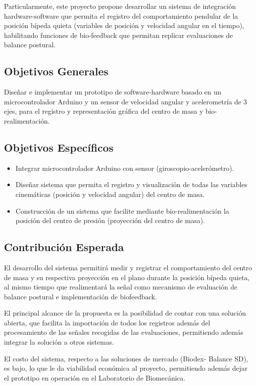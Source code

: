 \documentclass[12pt,a4paper]{article}
\begin{document}
Particularmente, este proyecto propone desarrollar un sistema de integración hardware-software que permita el registro del comportamiento pendular de la posición bípeda quieta (variables de posición y velocidad angular en el tiempo), habilitando funciones de bio-feedback que permitan replicar evaluaciones de balance postural.

\subsection{Objetivos Generales}
Diseñar e implementar un prototipo de software-hardware basado en un microcontrolador Arduino y un sensor de velocidad angular y acelerometría de 3 ejes, para el registro y representación gráfica del centro de masa y bio-realimentación.

\subsection{Objetivos Específicos}
\begin{itemize}
	\item Integrar microcontrolador Arduino con sensor (giroscopio-acelerómetro).
	\item Diseñar sistema que permita el registro y visualización de todas las variables cinemáticas (posición y velocidad angular) del centro de masa. 
	\item Construcción de un sistema que facilite mediante bio-realimentación la posición del centro de presión (proyección del centro de masa).
\end{itemize}	

\subsection{Contribución Esperada}

El desarrollo del sistema permitirá medir y registrar el comportamiento del centro de masa y su respectiva proyección en el plano durante la posición bípeda quieta, al mismo tiempo que realimentará la señal como mecanismo de evaluación de balance postural e implementación de biofeedback.

El principal alcance de la propuesta es la posibilidad de contar con una solución abierta, que facilita la importación de todos los registros además del procesamiento de las señales recogidas de las evaluaciones, permitiendo además integrar la solución a otros sistemas.

El costo del sistema, respecto a las soluciones de mercado (Biodex- Balance SD), es bajo, lo que le da viabilidad económica al proyecto, permitiendo además dejar el prototipo en operación en el Laboratorio de Biomecánica. 
\end{document}
